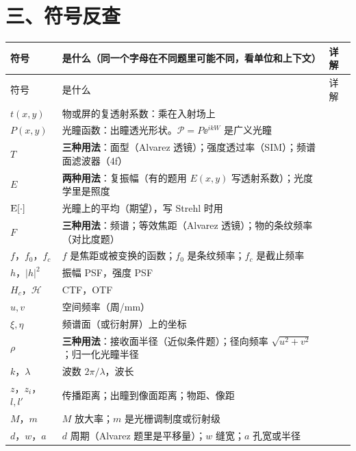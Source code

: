 \section*{三、符号反查}\label{tab:symbols}
{\footnotesize\setlength{\tabcolsep}{2.5pt}\renewcommand{\arraystretch}{1.2}
\begin{longtable}{@{}P{2.6cm}P{13.6cm}>{\raggedleft\arraybackslash}p{0.8cm}@{}}
\toprule
符号 & 是什么（同一个字母在不同题里可能不同，看单位和上下文）& 详解\\ \midrule
\endfirsthead
\toprule
符号 & 是什么 & 详解\\ \midrule
\endhead
\bottomrule
\endfoot
$t(x,y)$ & 物或屏的复透射系数：乘在入射场上 & \pageref{sec:p-tvsP}\\
$P(x,y)$ & 光瞳函数：出瞳透光形状。$\mathcal P=P\ee^{ikW}$ 是广义光瞳 & \pageref{sec:p-tvsP}\\
$T$ & \textbf{三种用法}：面型（Alvarez 透镜）；强度透过率（SIM）；频谱面滤波器（4f） & \pageref{sec:p-tvsP}\\
$E$ & \textbf{两种用法}：复振幅（有的题用 $E(x,y)$ 写透射系数）；光度学里是照度 & \pageref{sec:photounits}\\
$\mathrm{E}[\cdot]$ & 光瞳上的平均（期望），写 Strehl 时用 & \pageref{sec:aberrms}\\
$F$ & \textbf{三种用法}：频谱；等效焦距（Alvarez 透镜）；物的条纹频率（对比度题） & \pageref{sec:typeE}\\
$f$，$f_0$，$f_c$ & $f$ 是焦距或被变换的函数；$f_0$ 是条纹频率；$f_c$ 是截止频率 & \pageref{sec:sim}\\
$h$，$|h|^2$ & 振幅 PSF，强度 PSF & \pageref{sec:typeD}\\
$H_c$，$\mathcal H$ & CTF，OTF & \pageref{sec:typeA}\\
$u,v$ & 空间频率（周/mm） & \pageref{sec:spfreq}\\
$\xi,\eta$ & 频谱面（或衍射屏）上的坐标 & \pageref{sec:focalplane}\\
$\rho$ & \textbf{三种用法}：接收面半径（近似条件题）；径向频率 $\sqrt{u^2+v^2}$；归一化光瞳半径 & \pageref{box:approx}\\
$k$，$\lambda$ & 波数 $2\pi/\lambda$，波长 & \pageref{fml:ruler}\\
$z$，$z_i$，$l,l'$ & 传播距离；出瞳到像面距离；物距、像距 & \pageref{sec:lensimg}\\
$M$，$m$ & $M$ 放大率；$m$ 是光栅调制度或衍射级 & \pageref{sec:4fderiv}\\
$d$，$w$，$a$ & $d$ 周期（Alvarez 题里是平移量）；$w$ 缝宽；$a$ 孔宽或半径 & \pageref{fml:shapes}\\

\end{longtable}}
